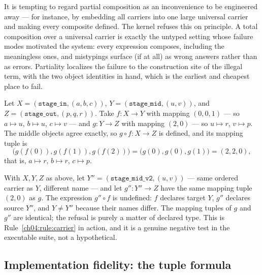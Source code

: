 \begin{remark}
\label{ch04:rem:partiality}
It is tempting to regard partial composition as an inconvenience to be
engineered away --- for instance, by embedding all carriers into one large
universal carrier and making every composite defined. The kernel refuses
this on principle. A total composition over a universal carrier is exactly
the untyped setting whose failure modes motivated the system: every
expression composes, including the meaningless ones, and mistypings surface
(if at all) as wrong answers rather than as errors. Partiality localizes the
failure to the construction site of the illegal term, with the two object
identities in hand, which is the earliest and cheapest place to fail.
\end{remark}

\begin{example}
\label{ch04:ex:good}
Let $X = (\texttt{stage\_in}, (a, b, c))$,
$Y = (\texttt{stage\_mid}, (u, v))$, and
$Z = (\texttt{stage\_out}, (p, q, r))$. Take $f : X \to Y$ with mapping
$(0, 0, 1)$ --- so $a \mapsto u$, $b \mapsto u$, $c \mapsto v$ --- and
$g : Y \to Z$ with mapping $(2, 0)$ --- so $u \mapsto r$, $v \mapsto p$.
The middle objects agree exactly, so $g \circ f : X \to Z$ is defined, and
its mapping tuple is
\[
  \bigl(g(f(0)), g(f(1)), g(f(2))\bigr) = \bigl(g(0), g(0), g(1)\bigr)
  = (2, 2, 0),
\]
that is, $a \mapsto r$, $b \mapsto r$, $c \mapsto p$.
\end{example}

\begin{example}
\label{ch04:ex:bad}
With $X, Y, Z$ as above, let $Y'' = (\texttt{stage\_mid\_v2}, (u, v))$ ---
same ordered carrier as $Y$, different name --- and let $g'' : Y'' \to Z$
have the same mapping tuple $(2, 0)$ as $g$. The expression $g'' \circ f$ is
undefined: $f$ declares target $Y$, $g''$ declares source $Y''$, and
$Y \ne Y''$ because their names differ. The mapping tuples of $g$ and $g''$
are identical; the refusal is purely a matter of declared type. This is
Rule~\ref{ch04:rule:carrier} in action, and it is a genuine negative test in
the executable suite, not a hypothetical.
\end{example}

\subsection{Implementation fidelity: the tuple formula}
\label{ch04:sec:tuple}


